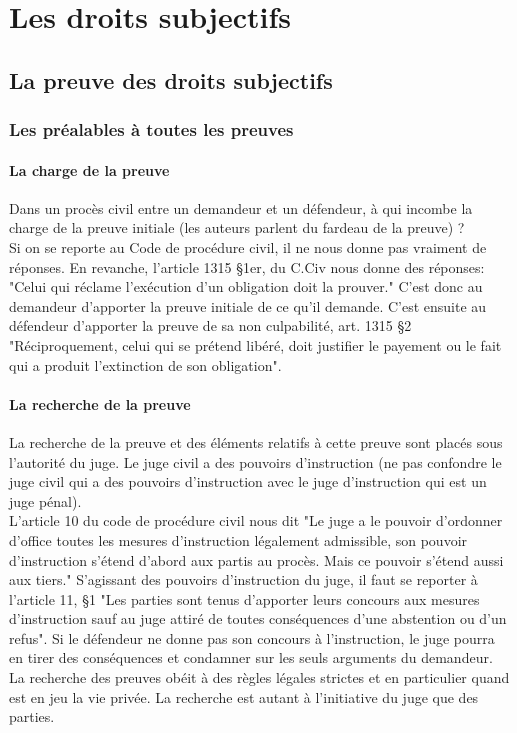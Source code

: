 \part{Les droits subjectifs}

\chapter{La preuve des droits subjectifs}

\section{Les préalables à toutes les preuves}

\subsection{La charge de la preuve}

Dans un procès civil entre un demandeur et un défendeur, à qui incombe la charge de la preuve initiale (les auteurs parlent du fardeau de la preuve) ? \\
Si on se reporte au Code de procédure civil, il ne nous donne pas vraiment de réponses. En revanche, l'article 1315 §1er, du C.Civ nous donne des réponses: "Celui qui réclame l'exécution d'un obligation doit la prouver." C'est donc au demandeur d'apporter la preuve initiale de ce qu'il demande. C'est ensuite au défendeur d'apporter la preuve de sa non culpabilité, art. 1315 §2 "Réciproquement, celui qui se prétend libéré, doit justifier le payement ou le fait qui a produit l'extinction de son obligation".

\subsection{La recherche de la preuve}

La recherche de la preuve et des éléments relatifs à cette preuve sont placés sous l'autorité du juge. Le juge civil a des pouvoirs d'instruction (ne pas confondre le juge civil qui a des pouvoirs d'instruction avec le juge d'instruction qui est un juge pénal). \\
L'article 10 du code de procédure civil nous dit "Le juge a le pouvoir d'ordonner d'office toutes les mesures d'instruction légalement admissible, son pouvoir d'instruction s'étend d'abord aux partis au procès. Mais ce pouvoir s'étend aussi aux tiers." S'agissant des pouvoirs d'instruction du juge, il faut se reporter à l'article 11, §1 "Les parties sont tenus d'apporter leurs concours aux mesures d'instruction sauf au juge attiré de toutes conséquences d'une abstention ou d'un refus". Si le défendeur ne donne pas son concours à l'instruction, le juge pourra en tirer des conséquences et condamner sur les seuls arguments du demandeur. \\
La recherche des preuves obéit à des règles légales strictes et en particulier quand est en jeu la vie privée. La recherche est autant à l'initiative du juge que des parties. 



